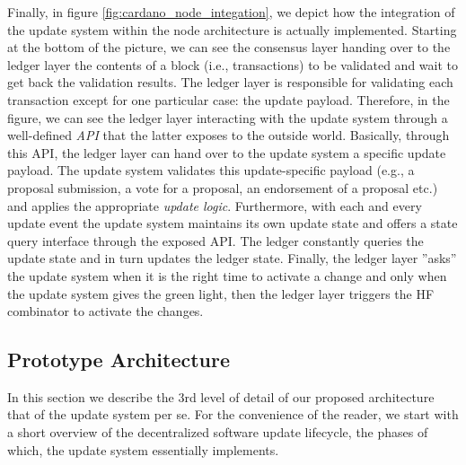 Finally, in figure \ref{fig:cardano_node_integation}, we depict how the
integration of the update system within the node architecture is actually
implemented. Starting at the bottom of the picture, we can see the consensus
layer handing over to the ledger layer the contents of a block (i.e.,
transactions) to be validated and wait to get back the validation results. The
ledger layer is responsible for validating each transaction except for one
particular case: the update payload. Therefore, in the figure, we can see the
ledger layer interacting with the update system through a well-defined
\emph{API} that the latter exposes to the outside world. Basically,
through this API, the ledger layer can hand over to the update system a
specific update payload. The update system validates this update-specific
payload (e.g., a proposal submission, a vote for a proposal, an endorsement of
a proposal etc.) and applies the appropriate \emph{update logic}. Furthermore,
with each and every update event the update system maintains its own update
state and offers a state query interface through the exposed API. The ledger
constantly queries the update state and in turn updates the ledger state.
Finally, the ledger layer ''asks'' the update system when it is the right time
to activate a change and only when the update system gives the green light,
then the ledger layer triggers the HF combinator to activate the changes.


\subsection{Prototype Architecture} \label{software_architecture}
In this section we describe the 3rd level of detail of our proposed
architecture that of the update system per se. For the convenience of the
reader, we start with a short overview of the decentralized software update
lifecycle, the phases of which, the update system essentially implements.

